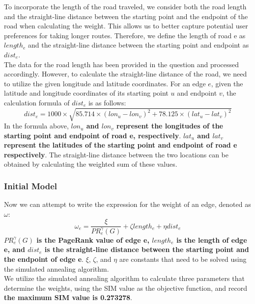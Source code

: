 \indent\indent To incorporate the length of the road traveled, we consider both the road length and the straight-line distance between the starting point and the endpoint of the road when calculating the weight. This allows us to better capture potential user preferences for taking longer routes. Therefore, we define the length of road e as $length_e$ and the straight-line distance between the starting point and endpoint as $dist_e$.\\
\indent The data for the road length has been provided in the question and processed accordingly. However, to calculate the straight-line distance of the road, we need to utilize the given longitude and latitude coordinates. For an edge $e$, given the latitude and longitude coordinates of its starting point $u$ and endpoint $v$, the calculation formula of $dist_e$ is as follows:
\begin{equation*}
    dist_e=1000\times \sqrt{85.714\times (lon_u-lon_v)^2+78.125\times (lat_u-lat_v)^2}
\end{equation*}
\indent In the formula above, \textbf{$lon_u$ and $lon_v$ represent the longitudes of the starting point and endpoint of road e, respectively}. \textbf{$lat_u$ and $lat_v$ represent the latitudes of the starting point and endpoint of road e  respectively}. The straight-line distance between the two locations can be obtained by calculating the weighted sum of these values.


\subsubsection{Initial Model}

\indent\indent Now we can attempt to write the expression for the weight of an edge, denoted as $\omega$:
\begin{equation*}
\omega_e=\frac{\xi}{PR^{\gamma}_e(G)}+\zeta length_e+\eta dist_e
\end{equation*}
\indent \textbf{$PR^{\gamma}_e(G)$ is the PageRank value of edge e, $length_e$ is the length of edge e, and $dist_e$ is the straight-line distance between the starting point and the endpoint of edge e}. $\xi$, $\zeta$, and $\eta$ are constants that need to be solved using the simulated annealing algorithm.\\
\indent We utilize the simulated annealing algorithm to calculate three parameters that determine the weights, using the SIM value as the objective function, and record \textbf{the maximum SIM value is 0.273278}.

